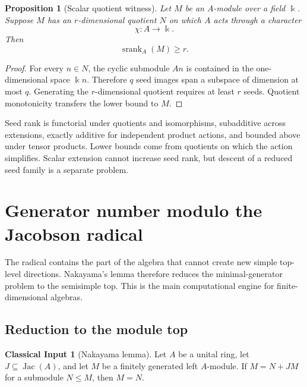 \documentclass[11pt]{article}
\newtheorem{proposition}[proposition]{Proposition}
\theoremstyle{definition}
\newtheorem{classicalinput}[classicalinput]{Classical Input}
\theoremstyle{remark}
\theoremstyle{definition}\newtheorem{example}[theorem]{Example}
\newcommand{\bbk}{\Bbbk}
\newcommand{\srank}{\operatorname{srank}}
\newcommand{\Jac}{\operatorname{Jac}}
\newcommand{\RecordID}[1]{\label{record:#1}}
\newcommand{\Depends}[1]{}
\begin{document}
\begin{proposition}[Scalar quotient witness]
\label{prop:scalar-quotient}
Let $M$ be an $A$-module over a field $\bbk$.  Suppose $M$ has an $r$-dimensional quotient $N$ on which $A$ acts through a character
\[
\chi:A\longrightarrow\bbk.
\]
Then
\[
\boxed{\srank_A(M)\geq r.}
\]
\end{proposition}
\RecordID{PSC-I-P-SCALAR-QUOTIENT-WITNESS}
\Depends{PSC-I-T-QUOTIENT-MONOTONICITY.}

\begin{proof}
For every $n\in N$, the cyclic submodule $An$ is contained in the one-dimensional space $\bbk n$.  Therefore $q$ seed images span a subspace of dimension at most $q$.  Generating the $r$-dimensional quotient requires at least $r$ seeds.  Quotient monotonicity transfers the lower bound to $M$.
\end{proof}

\begin{sectionrecap}
Seed rank is functorial under quotients and isomorphisms, subadditive across extensions, exactly additive for independent product actions, and bounded above under tensor products.  Lower bounds come from quotients on which the action simplifies.  Scalar extension cannot increase seed rank, but descent of a reduced seed family is a separate problem.
\end{sectionrecap}

\section{Generator number modulo the Jacobson radical}



\begin{readerroadmap}
The radical contains the part of the algebra that cannot create new simple top-level directions.  Nakayama's lemma therefore reduces the minimal-generator problem to the semisimple top.  This is the main computational engine for finite-dimensional algebras.
\end{readerroadmap}
\subsection{Reduction to the module top}

\begin{classicalinput}[Nakayama lemma]
\label{ci:nakayama}
Let $A$ be a unital ring, let $J\subseteq\Jac(A)$, and let $M$ be a finitely generated left $A$-module.  If $M=N+JM$ for a submodule $N\leq M$, then $M=N$.
\end{classicalinput}
\RecordID{PSC-I-CI-NAKAYAMA}
\end{document}
